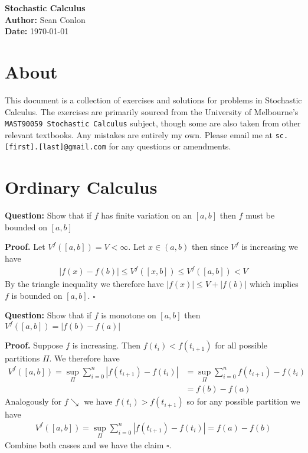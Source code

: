 \documentclass{article}
\begin{document}
\begin{titlepage}
    \centering
    {\Huge \textbf{Stochastic Calculus}}\\[1.5cm] %
    \textbf{Author:} Sean Conlon\\[1cm] %
    \textbf{Date:} \today\\[3cm] %
    
    \section*{About}
    This document is a collection of exercises and solutions for problems in Stochastic Calculus. The exercises are primarily sourced from the University of Melbourne's \texttt{MAST90059 Stochastic Calculus} subject, though some are also taken from other relevant textbooks. Any mistakes are entirely my own. Please email me at \texttt{sc.[first].[last]@gmail.com} for any questions or amendments.\\[2cm]

    \tableofcontents
    
\end{titlepage}

\newpage
\section{Ordinary Calculus}

\begin{tcolorbox}[colframe=black,colback=gray!5,boxrule=0.5pt]
\textbf{Question:} Show that if $f$ has finite variation on an $[a,b]$ then $f$ must be bounded on $[a,b]$
\end{tcolorbox}
\textbf{Proof.} Let $V^f([a,b]) = V<\infty$. Let $x\in(a,b)$ then since $V^f$ is increasing we have 
\begin{align*}
    |f(x)-f(b)| \leq V^f([x,b]) \leq V^f([a,b]) < V
\end{align*}
By the triangle inequality we therefore have $|f(x)|\leq V+|f(b)|$ which implies $f$ is bounded on $[a,b].$ $\square$

\begin{tcolorbox}[colframe=black,colback=gray!5,boxrule=0.5pt]
\textbf{Question:} Show that if $f$ is monotone on $[a,b]$ then $V^f([a,b]) = |f(b)-f(a)|$
\end{tcolorbox}
\textbf{Proof.} Suppose $f$ is increasing. Then $f(t_i) < f(t_{i+1})$ for all possible partitions $\Pi$. We therefore have
\begin{align*}
    V^f([a,b]) = \sup_{\Pi}\sum_{{i=0}}^{n}|f(t_{i+1}) - f(t_i)| &= \sup_{\Pi}\sum_{{i=0}}^{n}f(t_{i+1}) - f(t_i) \\
    &= f(b) - f(a)
\end{align*}
Analogously for $f\searrow$ we have $f(t_i) > f(t_{i+1})$ so for any possible partition we have
\begin{align*}
    V^f([a,b]) = \sup_{\Pi}\sum_{{i=0}}^{n}|f(t_{i+1}) - f(t_i)| = f(a) - f(b)
\end{align*}
Combine both casses and we have the claim $\square$.
\end{document}
